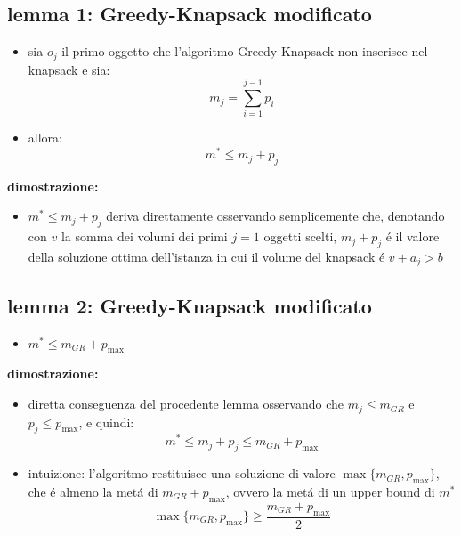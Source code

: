 \subsection*{lemma 1: Greedy-Knapsack modificato}
\begin{flushleft}
	\begin{itemize}
		\item sia $o_j$ il primo oggetto che l'algoritmo Greedy-Knapsack non inserisce nel knapsack e sia:
			$$m_j=\sum_{i=1}^{j-1}p_i$$
		\item allora:
			$$m^*\leq m_j+p_j$$
	\end{itemize}
	\vspace{0.5cm}
	\textbf{dimostrazione:}
	\begin{itemize}
		\item $m^*\leq m_j+p_j$ deriva direttamente osservando semplicemente che, denotando con $v$ la somma dei volumi dei primi $j=1$ oggetti scelti, $m_j+p_j$ \'e il valore della soluzione ottima dell'istanza in cui il volume del knapsack \'e $v+a_j>b$
	\end{itemize}
\end{flushleft}


\subsection*{lemma 2: Greedy-Knapsack modificato}
\begin{flushleft}
	\begin{itemize}
		\item $m^*\leq m_{GR}+p_{\max}$
	\end{itemize}
	\vspace{0.5cm}
	\textbf{dimostrazione:}
	\begin{itemize}
		\item diretta conseguenza del procedente lemma osservando che $m_j\leq m_{GR}$ e $p_j\leq p_{\max}$, e quindi:
			$$m^*\leq m_j+p_j\leq m_{GR}+p_{\max}$$
		\item intuizione: l'algoritmo restituisce una soluzione di valore $\max\{m_{GR},p_{\max}\}$, che \'e almeno la met\'a di $m_{GR}+p_{\max}$, ovvero la met\'a di un upper bound di $m^*$
			$$\max\{m_{GR},p_{\max}\}\geq\frac{m_{GR}+p_{\max}}{2}$$
	\end{itemize}
\end{flushleft}


